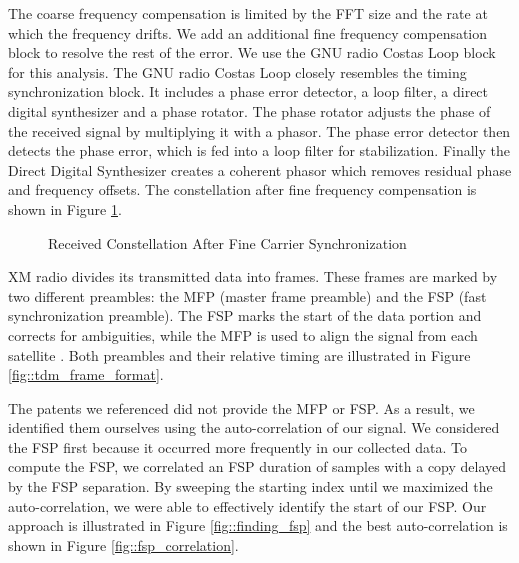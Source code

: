 \documentclass[conference,onecolumn]{IEEEtran}
\begin{document}
The coarse frequency compensation is limited by the FFT size and the rate at which the frequency drifts. We add an additional fine frequency compensation block to resolve the rest of the error. We use the GNU radio Costas Loop block for this analysis. The GNU radio Costas Loop closely resembles the timing synchronization block. It includes a phase error detector, a loop filter, a direct digital synthesizer and a phase rotator.
The phase rotator adjusts the phase of the received signal by multiplying it with a phasor. The phase error detector then detects the phase error, which is fed into a loop filter for stabilization. Finally the Direct Digital Synthesizer creates a coherent phasor which removes residual phase and frequency offsets. The constellation after fine frequency compensation is shown in Figure \ref{fig::constellation_after_fine_carrier_comp}.

\begin{figure}[H]
	\centerline{}
	\caption{Received Constellation After Fine Carrier Synchronization}
	\label{fig::constellation_after_fine_carrier_comp}
\end{figure}

XM radio divides its transmitted data into frames. These frames are marked by two different preambles: the MFP (master frame preamble) and the FSP (fast synchronization preamble). The FSP marks the start of the data portion and corrects for ambiguities, while the MFP is used to align the signal from each satellite \cite{a2008_us8260192b2}. Both preambles and their relative timing are illustrated in Figure \ref{fig::tdm_frame_format}.

The patents we referenced did not provide the MFP or FSP. As a result, we identified them ourselves using the auto-correlation of our signal. We considered the FSP first because it occurred more frequently in our collected data. To compute the FSP, we correlated an FSP duration of samples with a copy delayed by the FSP separation. By sweeping the starting index until we maximized the auto-correlation, we were able to effectively identify the start of our FSP. Our approach is illustrated in Figure \ref{fig::finding_fsp} and the best auto-correlation is shown in Figure \ref{fig::fsp_correlation}.
\end{document}
